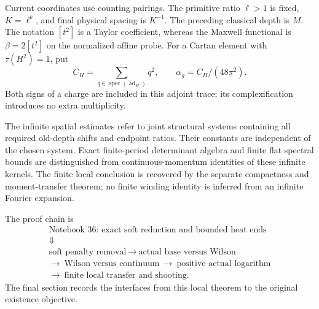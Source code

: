 \documentclass[11pt]{article}
\theoremstyle{remark}
\begin{document}
Current coordinates use counting pairings. The primitive ratio
\(\ell>1\) is fixed, \(K=\ell^k\), and final physical spacing is
\(K^{-1}\). The preceding classical depth is \(M\).
The notation \([t^2]\) is a Taylor coefficient, whereas the Maxwell
functional is \(\beta=2[t^2]\) on the normalized affine probe.
For a Cartan element with \(\tau(H^2)=1\), put
\[
 C_H=\sum_{q\in\operatorname{spec}(\operatorname{ad}_H)}q^2,
 \qquad \alpha_g=C_H/(48\pi^2).
\]
Both signs of a charge are included in this adjoint trace; its
complexification introduces no extra multiplicity.

The infinite spatial estimates refer to joint structural systems
containing all required old-depth shifts and endpoint ratios. Their
constants are independent of the chosen system. Exact finite-period
determinant algebra and finite flat spectral bounds are distinguished
from continuous-momentum identities of these infinite kernels.
The finite local conclusion is recovered by the separate compactness
and moment-transfer theorem; no finite winding identity is inferred
from an infinite Fourier expansion.

The proof chain is
\[
 \begin{gathered}
 \text{Notebook 36: exact soft reduction and bounded heat ends}\\
 \Downarrow\\
 \text{soft penalty removal}
 \ \longrightarrow\ \text{actual base versus Wilson}\\
 \longrightarrow\ \text{Wilson versus continuum}
 \ \longrightarrow\ \text{positive actual logarithm}\\
 \longrightarrow\ \text{finite local transfer and shooting}.
 \end{gathered}
\]
The final section records the interfaces from this local theorem
to the original existence objective.
\end{document}
